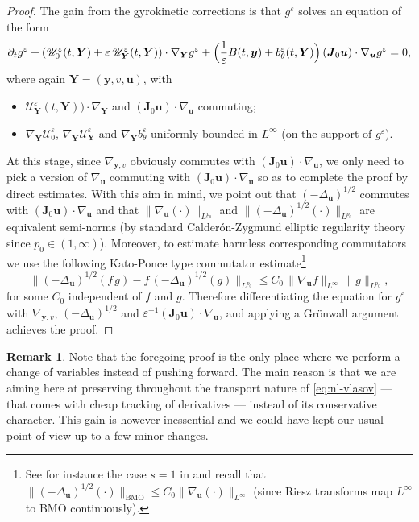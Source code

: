 \documentclass[10pt]{amsart}
\let\mathcal\mathscr
\let\eps\varepsilon
\let\d\partial
\theoremstyle{plain}
\theoremstyle{definition}
\newtheorem{remark}[theorem]{Remark}
\newcommand\br{\begin{remark}}
\newcommand\er{\end{remark}}
\newcommand\bJ{{\boldsymbol J}}
\newcommand\bY{{\boldsymbol Y}}
\newcommand\bfu{{\boldsymbol u}}
\newcommand\bfy{{\boldsymbol y}}
\newcommand\cU{{\mathcal U}}
\begin{document}
\begin{proof}
The gain from the gyrokinetic corrections is that $g^\eps$ solves an equation of the form
\[
\d_tg^\eps+(\cU_0^\eps(t,\bY)
+\eps\,\cU_\bY^\eps(t,\bY))\cdot\nabla_\bY g^\eps
+\Bigl(\frac1\eps B(t,\bfy)+b_\theta^\eps(t,\bY)\Bigr)\,(\bJ_0\bfu)\cdot\nabla_\bfu g^\eps=0,
\]
where again $\bY=(\bfy,v,\bfu)$, with
\begin{itemize}
\item $\cU_\bY^\eps(t,\bY))\cdot\nabla_\bY$ and $(\bJ_0\bfu)\cdot\nabla_\bfu$ commuting;
\item $\nabla_\bY\cU_0^\eps$, $\nabla_{\bY}\cU_\bY^\eps$ and $\nabla_{\bY}b_\theta^\eps$ uniformly bounded in $L^\infty$ (on the support of $g^\eps$).
\end{itemize}
At this stage, since $\nabla_{\bfy,v}$ obviously commutes with $(\bJ_0\bfu)\cdot\nabla_\bfu$, we only need to pick a version of $\nabla_\bfu$ commuting with $(\bJ_0\bfu)\cdot\nabla_\bfu$ so as to complete the proof by direct estimates. With this aim in mind, we point out that $(-\Delta_{\bfu})^{1/2}$ commutes with $(\bJ_0\bfu)\cdot\nabla_\bfu$ and that $\|\nabla_\bfu(\cdot)\|_{L^{p_0}}$ and $\|(-\Delta_{\bfu})^{1/2}(\cdot)\|_{L^{p_0}}$ are equivalent semi-norms (by standard Calderón-Zygmund elliptic regularity theory since $p_0\in(1,\infty)$). Moreover, to estimate harmless corresponding commutators we use the following Kato-Ponce type commutator estimate\footnote{See for instance the case $s=1$ in \cite[Th.\,5.1]{Li_Kato-Ponce} and recall that $\|(-\Delta_{\bfu})^{1/2}(\cdot)\|_\mathrm{BMO}\leq C_0 \|\nabla_{\bfu}(\cdot)\|_{L^\infty}$ (since Riesz transforms map $L^\infty$ to $\mathrm{BMO}$ continuously).}
\[
\|(-\Delta_{\bfu})^{1/2}(f\,g)-f\,(-\Delta_{\bfu})^{1/2}(g)\|_{L^{p_0}}
\leq C_0\,\|\nabla_\bfu f\|_{L^\infty}\,\|g\|_{L^{p_0}},
\]
for some $C_0$ independent of $f$ and $g$. Therefore differentiating the equation for $g^\eps$ with $\nabla_{\bfy,v}$, $(-\Delta_{\bfu})^{1/2}$ and $\eps^{-1}(\bJ_0\bfu)\cdot\nabla_\bfu$, and applying a Grönwall argument achieves the proof.
\end{proof}

\br
Note that the foregoing proof is the only place where we perform a change of variables instead of pushing forward. The main reason is that we are aiming here at preserving throughout the transport nature of \eqref{eq:nl-vlasov} --- that comes with cheap tracking of derivatives --- instead of its conservative character. This gain is however inessential and we could have kept our usual point of view up to a few minor changes.
\er
\end{document}
